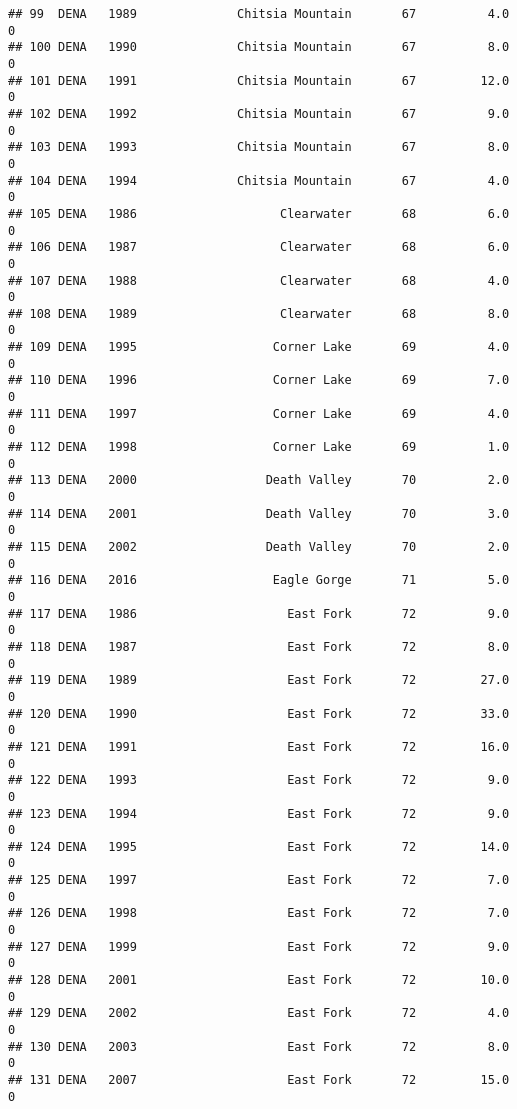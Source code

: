 \documentclass[
]{article}
\begin{document}
\begin{verbatim}
## 99  DENA   1989              Chitsia Mountain       67          4.0       0
## 100 DENA   1990              Chitsia Mountain       67          8.0       0
## 101 DENA   1991              Chitsia Mountain       67         12.0       0
## 102 DENA   1992              Chitsia Mountain       67          9.0       0
## 103 DENA   1993              Chitsia Mountain       67          8.0       0
## 104 DENA   1994              Chitsia Mountain       67          4.0       0
## 105 DENA   1986                    Clearwater       68          6.0       0
## 106 DENA   1987                    Clearwater       68          6.0       0
## 107 DENA   1988                    Clearwater       68          4.0       0
## 108 DENA   1989                    Clearwater       68          8.0       0
## 109 DENA   1995                   Corner Lake       69          4.0       0
## 110 DENA   1996                   Corner Lake       69          7.0       0
## 111 DENA   1997                   Corner Lake       69          4.0       0
## 112 DENA   1998                   Corner Lake       69          1.0       0
## 113 DENA   2000                  Death Valley       70          2.0       0
## 114 DENA   2001                  Death Valley       70          3.0       0
## 115 DENA   2002                  Death Valley       70          2.0       0
## 116 DENA   2016                   Eagle Gorge       71          5.0       0
## 117 DENA   1986                     East Fork       72          9.0       0
## 118 DENA   1987                     East Fork       72          8.0       0
## 119 DENA   1989                     East Fork       72         27.0       0
## 120 DENA   1990                     East Fork       72         33.0       0
## 121 DENA   1991                     East Fork       72         16.0       0
## 122 DENA   1993                     East Fork       72          9.0       0
## 123 DENA   1994                     East Fork       72          9.0       0
## 124 DENA   1995                     East Fork       72         14.0       0
## 125 DENA   1997                     East Fork       72          7.0       0
## 126 DENA   1998                     East Fork       72          7.0       0
## 127 DENA   1999                     East Fork       72          9.0       0
## 128 DENA   2001                     East Fork       72         10.0       0
## 129 DENA   2002                     East Fork       72          4.0       0
## 130 DENA   2003                     East Fork       72          8.0       0
## 131 DENA   2007                     East Fork       72         15.0       0

\end{verbatim}
\end{document}
